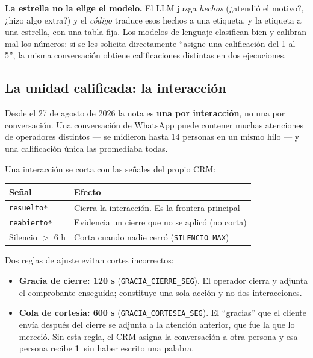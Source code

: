 \documentclass[11pt,a4paper]{article}
\newcommand{\cod}[1]{\texttt{\small #1}}
\newcommand{\est}[1]{\textbf{#1}\,\raisebox{0.5pt}{$\star$}}
\begin{document}
\begin{nota}
\textbf{La estrella no la elige el modelo.} El LLM juzga \emph{hechos} (¿atendió el
motivo?, ¿hizo algo extra?) y el \emph{código} traduce esos hechos a una etiqueta, y
la etiqueta a una estrella, con una tabla fija. Los modelos de lenguaje clasifican
bien y calibran mal los números: si se les solicita directamente ``asigne una
calificación del 1
al 5'', la misma conversación obtiene calificaciones distintas en dos ejecuciones.
\end{nota}

\subsection{La unidad calificada: la interacción}

Desde el 27 de agosto de 2026 la nota es \textbf{una por interacción}, no una por
conversación. Una conversación de WhatsApp puede contener muchas atenciones de
operadores distintos --- se midieron hasta 14 personas en un mismo hilo --- y una
calificación única las promediaba todas.

Una interacción se corta con las señales del propio CRM:

\begin{center}
\begin{tabular}{@{}lL@{}}
\toprule
\textbf{Señal} & \textbf{Efecto} \\
\midrule
\cod{*resuelto*} & Cierra la interacción. Es la frontera principal \\
\cod{*reabierto*} & Evidencia un cierre que no se aplicó (no corta) \\
Silencio $>$ 6 h & Corta cuando nadie cerró (\cod{SILENCIO\_MAX}) \\
\bottomrule
\end{tabular}
\end{center}

\medskip
Dos reglas de ajuste evitan cortes incorrectos:

\begin{itemize}
\item \textbf{Gracia de cierre: 120 s} (\cod{GRACIA\_CIERRE\_SEG}). El operador cierra
y adjunta el comprobante enseguida; constituye una sola acción y no dos interacciones.
\item \textbf{Cola de cortesía: 600 s} (\cod{GRACIA\_CORTESIA\_SEG}). El ``gracias''
que el cliente envía después del cierre se adjunta a la atención anterior, que fue la
que lo mereció. Sin esta regla, el CRM asigna la conversación a otra persona y esa
persona recibe
\est{1} sin haber escrito una palabra.
\end{itemize}
\end{document}
